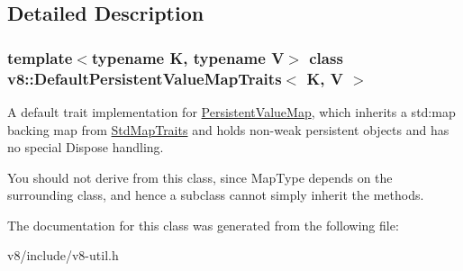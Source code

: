 \subsection{Detailed Description}
\subsubsection*{template$<$typename K, typename V$>$\newline
class v8\+::\+Default\+Persistent\+Value\+Map\+Traits$<$ K, V $>$}

A default trait implementation for \mbox{\hyperlink{classv8_1_1PersistentValueMap}{Persistent\+Value\+Map}}, which inherits a std\+:map backing map from \mbox{\hyperlink{classv8_1_1StdMapTraits}{Std\+Map\+Traits}} and holds non-\/weak persistent objects and has no special Dispose handling.

You should not derive from this class, since Map\+Type depends on the surrounding class, and hence a subclass cannot simply inherit the methods. 

The documentation for this class was generated from the following file\+:\begin{DoxyCompactItemize}
\item 
v8/include/v8-\/util.\+h\end{DoxyCompactItemize}
